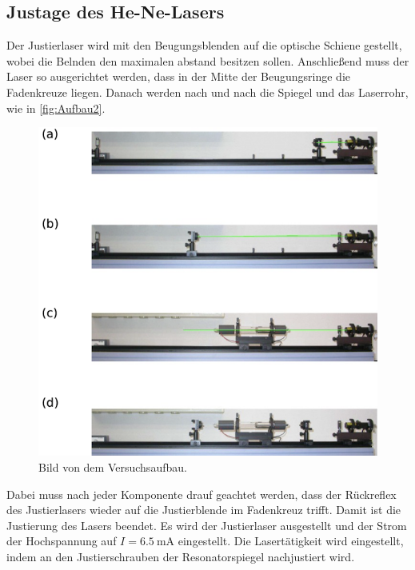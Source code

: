 \subsection{Justage des He-Ne-Lasers}
\label{subsec:Justage}
Der Justierlaser wird mit den Beugungsblenden auf die optische Schiene gestellt, wobei die Belnden den maximalen abstand besitzen sollen.
Anschließend muss der Laser so ausgerichtet werden, dass in der Mitte der Beugungsringe die Fadenkreuze liegen.
Danach werden nach und nach die Spiegel und das Laserrohr, wie in \autoref{fig:Aufbau2}.
\begin{figure}[H]
    \centering
    \includegraphics[scale=0.7]{Abbildungen/Aufbau2.png}
    \caption{Bild von dem Versuchsaufbau.\cite{V61}}
    \label{fig:Aufbau2}
\end{figure}
Dabei muss nach jeder Komponente drauf geachtet werden, dass der Rückreflex des Justierlasers wieder auf die Justierblende im Fadenkreuz trifft.
Damit ist die Justierung des Lasers beendet. Es wird der Justierlaser ausgestellt und der Strom der Hochspannung
auf $I = \qty{6.5}{\milli\A}$ eingestellt. Die Lasertätigkeit wird eingestellt, indem an den Justierschrauben der Resonatorspiegel nachjustiert wird.
